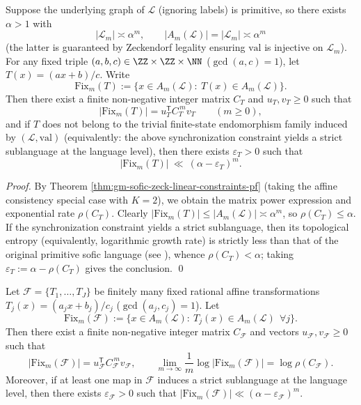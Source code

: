 \begin{theorem}\label{thm:gm-affine-selfmap-spectral-gap}
Suppose the underlying graph of \(\mathcal{L}\) (ignoring labels) is primitive, so there exists \(\alpha>1\) with
\[
|\mathcal{L}_m|\asymp \alpha^m,
\qquad
|A_m(\mathcal{L})|=|\mathcal{L}_m|\asymp \alpha^m
\]
(the latter is guaranteed by Zeckendorf legality ensuring \(\mathrm{val}\) is injective on \(\mathcal{L}_m\)).
For any fixed triple \((a,b,c)\in\ZZ\times\ZZ\times\NN\) (\(\gcd(a,c)=1\)), let \(T(x)=(ax+b)/c\).
Write
\[
\mathrm{Fix}_m(T):=\{x\in A_m(\mathcal{L}):\ T(x)\in A_m(\mathcal{L})\}.
\]
Then there exist a finite non-negative integer matrix \(C_T\) and \(u_T,v_T\ge 0\) such that
\[
|\mathrm{Fix}_m(T)|=u_T^{\mathsf T}C_T^{\,m}v_T\qquad(m\ge 0),
\]
and if \(T\) does not belong to the trivial finite-state endomorphism family induced by \((\mathcal{L},\mathrm{val})\) (equivalently: the above synchronization constraint yields a strict sublanguage at the language level), then there exists \(\varepsilon_T>0\) such that
\[
|\mathrm{Fix}_m(T)|\ \ll\ (\alpha-\varepsilon_T)^m.
\]
\end{theorem}

\begin{proof}
By Theorem \ref{thm:gm-sofic-zeck-linear-constraints-pf} (taking the affine consistency special case with \(K=2\)), we obtain the matrix power expression and exponential rate \(\rho(C_T)\).
Clearly \(|\mathrm{Fix}_m(T)|\le |A_m(\mathcal{L})|\asymp\alpha^m\), so \(\rho(C_T)\le \alpha\).
If the synchronization constraint yields a strict sublanguage, then its topological entropy (equivalently, logarithmic growth rate) is strictly less than that of the original primitive sofic language (see \cite[Chapter~4]{LindMarcus1995}), whence \(\rho(C_T)<\alpha\); taking \(\varepsilon_T:=\alpha-\rho(C_T)\) gives the conclusion. \qed
\end{proof}

\begin{theorem}\label{thm:gm-multi-affine-closure-decay}
Let \(\mathcal{F}=\{T_1,\dots,T_J\}\) be finitely many fixed rational affine transformations \(T_j(x)=(a_jx+b_j)/c_j\) (\(\gcd(a_j,c_j)=1\)).
Let
\[
\mathrm{Fix}_m(\mathcal{F})
:=\{x\in A_m(\mathcal{L}):\ T_j(x)\in A_m(\mathcal{L})\ \ \forall j\}.
\]
Then there exist a finite non-negative integer matrix \(C_{\mathcal{F}}\) and vectors \(u_{\mathcal{F}},v_{\mathcal{F}}\ge 0\) such that
\[
|\mathrm{Fix}_m(\mathcal{F})|
=u_{\mathcal{F}}^{\mathsf T}C_{\mathcal{F}}^{\,m}v_{\mathcal{F}},
\qquad
\lim_{m\to\infty}\frac{1}{m}\log|\mathrm{Fix}_m(\mathcal{F})|
=\log\rho(C_{\mathcal{F}}).
\]
Moreover, if at least one map in \(\mathcal{F}\) induces a strict sublanguage at the language level, then there exists \(\varepsilon_{\mathcal{F}}>0\) such that
\(
|\mathrm{Fix}_m(\mathcal{F})|\ll (\alpha-\varepsilon_{\mathcal{F}})^m
\).
\end{theorem}

